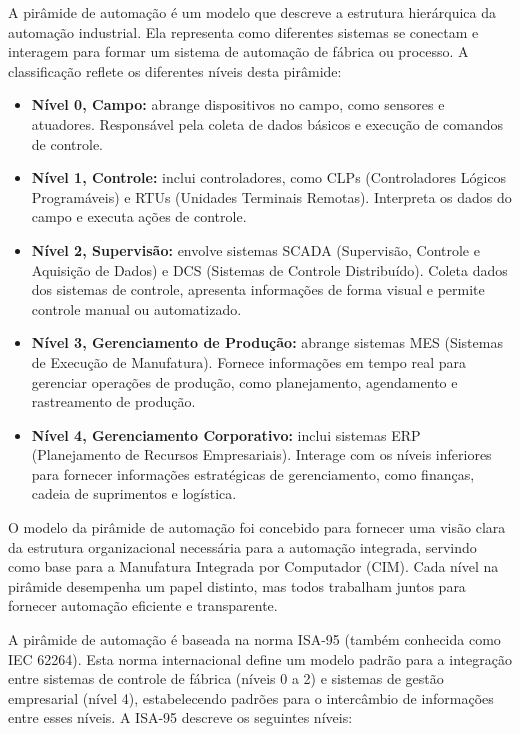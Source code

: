 \documentclass[11pt,a4paper]{article}
\begin{document}
\begin{apoio}
A pirâmide de automação é um modelo que descreve a estrutura hierárquica da automação industrial. Ela representa como diferentes sistemas se conectam e interagem para formar um sistema de automação de fábrica ou processo. A classificação reflete os diferentes níveis desta pirâmide:

\begin{itemize}[leftmargin=1.2em, itemsep=2pt, topsep=3pt]
\item \textbf{Nível 0, Campo:} abrange dispositivos no campo, como sensores e atuadores. Responsável pela coleta de dados básicos e execução de comandos de controle.
\item \textbf{Nível 1, Controle:} inclui controladores, como CLPs (Controladores Lógicos Programáveis) e RTUs (Unidades Terminais Remotas). Interpreta os dados do campo e executa ações de controle.
\item \textbf{Nível 2, Supervisão:} envolve sistemas SCADA (Supervisão, Controle e Aquisição de Dados) e DCS (Sistemas de Controle Distribuído). Coleta dados dos sistemas de controle, apresenta informações de forma visual e permite controle manual ou automatizado.
\item \textbf{Nível 3, Gerenciamento de Produção:} abrange sistemas MES (Sistemas de Execução de Manufatura). Fornece informações em tempo real para gerenciar operações de produção, como planejamento, agendamento e rastreamento de produção.
\item \textbf{Nível 4, Gerenciamento Corporativo:} inclui sistemas ERP (Planejamento de Recursos Empresariais). Interage com os níveis inferiores para fornecer informações estratégicas de gerenciamento, como finanças, cadeia de suprimentos e logística.
\end{itemize}

O modelo da pirâmide de automação foi concebido para fornecer uma visão clara da estrutura organizacional necessária para a automação integrada, servindo como base para a Manufatura Integrada por Computador (CIM). Cada nível na pirâmide desempenha um papel distinto, mas todos trabalham juntos para fornecer automação eficiente e transparente.

A pirâmide de automação é baseada na norma ISA-95 (também conhecida como IEC 62264). Esta norma internacional define um modelo padrão para a integração entre sistemas de controle de fábrica (níveis 0 a 2) e sistemas de gestão empresarial (nível 4), estabelecendo padrões para o intercâmbio de informações entre esses níveis. A ISA-95 descreve os seguintes níveis:


\end{apoio}
\end{document}
